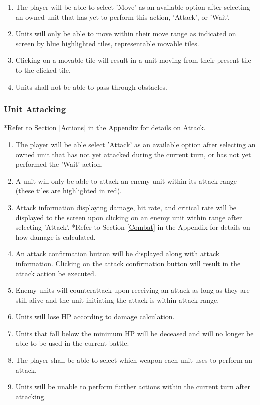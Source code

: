 \documentclass{article}
\begin{document}
\begin{enumerate}[resume]
    \item The player will be able to select 'Move' as an available option after selecting an owned unit that has yet to perform this action, 'Attack', or 'Wait'.
    \item Units will only be able to move within their move range as indicated on screen by blue highlighted tiles, representable movable tiles.
    \item Clicking on a movable tile will result in a unit moving from their present tile to the clicked tile.
    \item Units shall not be able to pass through obstacles.
\end{enumerate}

\subsubsection{Unit Attacking} \label{Attacking}
*Refer to Section \ref{Actions} in the Appendix for details on Attack.

\begin{enumerate}[resume]
    \item The player will be able select 'Attack' as an available option after selecting an owned unit that has not yet attacked during the current turn, or has not yet performed the 'Wait' action.
    \item A unit will only be able to attack an enemy unit within its attack range  (these tiles are highlighted in red).
    \item Attack information displaying damage, hit rate, and critical rate will be displayed to the screen upon clicking on an enemy unit within range after selecting 'Attack'. *Refer to Section \ref{Combat} in the Appendix for details on how damage is calculated.
    \item An attack confirmation button will be displayed along with attack information. Clicking on the attack confirmation button will result in the attack action be executed.
    \item Enemy units will counterattack upon receiving an attack as long as they are still alive and the unit initiating the attack is within attack range.
    \item Units will lose HP according to damage calculation.
    \item Units that fall below the minimum HP will be deceased and will no longer be able to be used in the current battle.
    \item The player shall be able to select which weapon each unit uses to perform an attack.
    \item Units will be unable to perform further actions within the current turn after attacking.
\end{enumerate}
\end{document}
